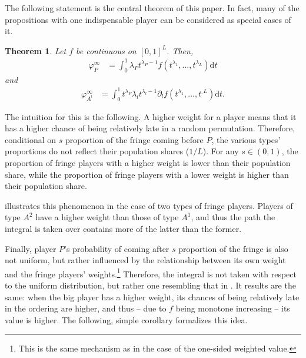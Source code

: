 \documentclass[a4paper]{article}
\newtheorem{theorem}{Theorem}
\newcommand{\dt}{\mathrm{d}t}
\begin{document}
The following statement is the central theorem of this paper.
In fact, many of the propositions with one indispensable player can be considered as special cases of it.
\begin{theorem}
    \label{prop:many_sided_weighted}
    Let $f$ be continuous on $[0, 1]^L$.
    Then,
    \begin{align*}
        \varphi_P^\infty & = \int_0^1 \lambda_P t^{\lambda_P - 1} f(t^{\lambda_1}, \dots, t^{\lambda_L}) \dt
    \end{align*}
    and
    \begin{align*}
        \varphi_{A^l}^\infty & = \int_0^1 t^{\lambda_P} \lambda_l t^{\lambda_l - 1} \partial_l f(t^{\lambda_1}, \dots, t^{\_L}) \dt.
    \end{align*}
\end{theorem}
The intuition for this is the following.
A higher weight for a player means that it has a higher chance of being relatively late in a random permutation.
Therefore, conditional on $s$ proportion of the fringe coming before $P$, the various types' proportions do not reflect their population shares ($1/L$).
For any $s \in (0, 1)$, the proportion of fringe players with a higher weight is lower than their population share, while the proportion of fringe players with a lower weight is higher than their population share.

 illustrates this phenomenon in the case of two types of fringe players.
Players of type $A^2$ have a higher weight than those of type $A^1$, and thus the path the integral is taken over contains more of the latter than the former.

Finally, player $P$'s probability of coming after $s$ proportion of the fringe is also not uniform, but rather influenced by the relationship between its own weight and the fringe players' weights.\footnote{
    This is the same mechanism as in the case of the one-sided weighted value.
} 
Therefore, the integral is not taken with respect to the uniform distribution, but rather one resembling that in .
It results are the same: when the big player has a higher weight, its chances of being relatively late in the ordering are higher, and thus -- due to $f$ being monotone increasing -- its value is higher.
The following, simple corollary formalizes this idea.
\end{document}
